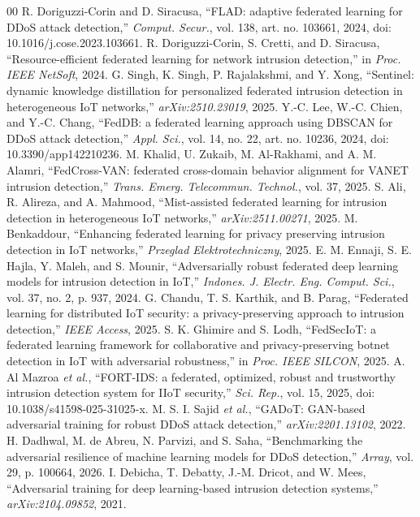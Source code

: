 \documentclass[conference,onecolumn]{IEEEtran}
\begin{document}
\begin{thebibliography}{00}
 R. Doriguzzi-Corin and D. Siracusa, ``FLAD: adaptive federated learning for DDoS attack detection,'' \textit{Comput. Secur.}, vol. 138, art. no. 103661, 2024, doi: 10.1016/j.cose.2023.103661.
 R. Doriguzzi-Corin, S. Cretti, and D. Siracusa, ``Resource-efficient federated learning for network intrusion detection,'' in \textit{Proc. IEEE NetSoft}, 2024.
 G. Singh, K. Singh, P. Rajalakshmi, and Y. Xong, ``Sentinel: dynamic knowledge distillation for personalized federated intrusion detection in heterogeneous IoT networks,'' \textit{arXiv:2510.23019}, 2025.
 Y.-C. Lee, W.-C. Chien, and Y.-C. Chang, ``FedDB: a federated learning approach using DBSCAN for DDoS attack detection,'' \textit{Appl. Sci.}, vol. 14, no. 22, art. no. 10236, 2024, doi: 10.3390/app142210236.
 M. Khalid, U. Zukaib, M. Al-Rakhami, and A. M. Alamri, ``FedCross-VAN: federated cross-domain behavior alignment for VANET intrusion detection,'' \textit{Trans. Emerg. Telecommun. Technol.}, vol. 37, 2025.
 S. Ali, R. Alireza, and A. Mahmood, ``Mist-assisted federated learning for intrusion detection in heterogeneous IoT networks,'' \textit{arXiv:2511.00271}, 2025.
 M. Benkaddour, ``Enhancing federated learning for privacy preserving intrusion detection in IoT networks,'' \textit{Przeglad Elektrotechniczny}, 2025.
 E. M. Ennaji, S. E. Hajla, Y. Maleh, and S. Mounir, ``Adversarially robust federated deep learning models for intrusion detection in IoT,'' \textit{Indones. J. Electr. Eng. Comput. Sci.}, vol. 37, no. 2, p. 937, 2024.
 G. Chandu, T. S. Karthik, and B. Parag, ``Federated learning for distributed IoT security: a privacy-preserving approach to intrusion detection,'' \textit{IEEE Access}, 2025.
 S. K. Ghimire and S. Lodh, ``FedSecIoT: a federated learning framework for collaborative and privacy-preserving botnet detection in IoT with adversarial robustness,'' in \textit{Proc. IEEE SILCON}, 2025.
 A. Al Mazroa \textit{et al.}, ``FORT-IDS: a federated, optimized, robust and trustworthy intrusion detection system for IIoT security,'' \textit{Sci. Rep.}, vol. 15, 2025, doi: 10.1038/s41598-025-31025-x.
 M. S. I. Sajid \textit{et al.}, ``GADoT: GAN-based adversarial training for robust DDoS attack detection,'' \textit{arXiv:2201.13102}, 2022.
 H. Dadhwal, M. de Abreu, N. Parvizi, and S. Saha, ``Benchmarking the adversarial resilience of machine learning models for DDoS detection,'' \textit{Array}, vol. 29, p. 100664, 2026.
 I. Debicha, T. Debatty, J.-M. Dricot, and W. Mees, ``Adversarial training for deep learning-based intrusion detection systems,'' \textit{arXiv:2104.09852}, 2021.

\end{thebibliography}
\end{document}
